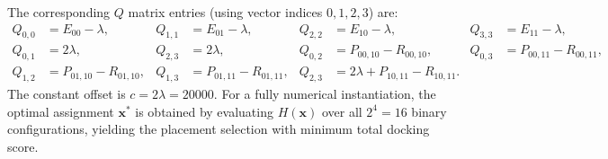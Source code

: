 \documentclass[12pt]{article}
\begin{document}
The corresponding $Q$ matrix entries (using vector indices $0,1,2,3$) are:
\begin{align}
  Q_{0,0} &= E_{00} - \lambda, & Q_{1,1} &= E_{01} - \lambda, & Q_{2,2} &= E_{10} - \lambda, & Q_{3,3} &= E_{11} - \lambda, \\
  Q_{0,1} &= 2\lambda, & Q_{2,3} &= 2\lambda, & Q_{0,2} &= P_{00,10} - R_{00,10}, & Q_{0,3} &= P_{00,11} - R_{00,11}, \\
  Q_{1,2} &= P_{01,10} - R_{01,10}, & Q_{1,3} &= P_{01,11} - R_{01,11}, & Q_{2,3} &= 2\lambda + P_{10,11} - R_{10,11}.
\end{align}
The constant offset is $c = 2\lambda = 20000$. For a fully numerical instantiation, the optimal assignment $\mathbf{x}^*$ is obtained by evaluating $H(\mathbf{x})$ over all $2^4 = 16$ binary configurations, yielding the placement selection with minimum total docking score.
\end{document}
